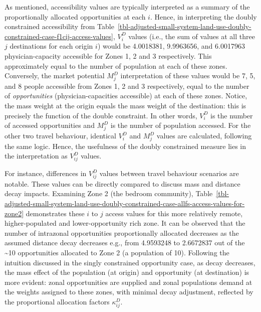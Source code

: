 \documentclass[
]{article}
\begin{document}
As mentioned, accessibility values are typically interpreted as a
summary of the proportionally allocated opportunities at each \(i\).
Hence, in interpreting the doubly constrained accessibility from
Table~\ref{tbl-adjusted-small-system-land-use-doubly-constrained-case-f1cij-access-values},
\(V_i^D\) values (i.e., the sum of values at all three \(j\)
destinations for each origin \(i\)) would be 4.0018381, 9.9963656, and
6.0017963 physician-capacity accessible for Zones 1, 2 and 3
respectively. This approximately equal to the number of population at
each of these zones. Conversely, the market potential \(M_j^D\)
interpretation of these values would be 7, 5, and 8 people accessible
from Zones 1, 2 and 3 respectively, equal to the number of
\emph{opportunities} (physician-capacities accessible) at each of these
zones. Notice, the mass weight at the origin equals the mass weight of
the destination: this is precisely the function of the double
constraint. In other words, \(V_i^D\) is the number of accessed
opportunities and \(M_j^D\) is the number of population accessed. For
the other two travel behaviour, identical \(V_i^D\) and \(M_j^D\) values
are calculated, following the same logic. Hence, the usefulness of the
doubly constrained measure lies in the interpretation as \(V_{ij}^D\)
values.

For instance, differences in \(V_{ij}^D\) values between travel
behaviour scenarios are notable. These values can be directly compared
to discuss mass and distance decay impacts. Examining Zone 2 (the
bedroom community),
Table~\ref{tbl-adjusted-small-system-land-use-doubly-constrained-case-allfs-access-values-for-zone2}
demonstrates these \(i\) to \(j\) access values for this more relatively
remote, higher-populated and lower-opportunity rich zone. It can be
observed that the number of intrazonal opportunities proportionally
allocated decreases as the assumed distance decay decreases e.g., from
4.9593248 to 2.6672837 out of the \textasciitilde10 opportunities
allocated to Zone 2 (a population of 10). Following the intuition
discussed in the singly constrained opportunity case, as decay
decreases, the mass effect of the population (at origin) and opportunity
(at destination) is more evident: zonal opportunities are supplied and
zonal populations demand at the weights assigned to these zones, with
minimal decay adjustment, reflected by the proportional allocation
factors \(\kappa_{ij}^D\).
\end{document}
